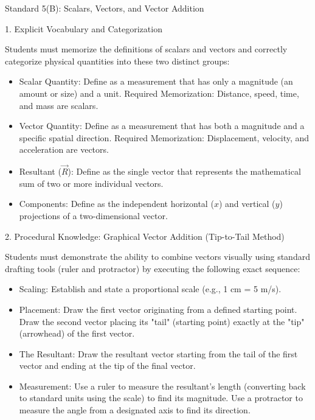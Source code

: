 \documentclass[]{article}
\begin{document}



Standard 5(B): Scalars, Vectors, and Vector Addition

1. Explicit Vocabulary and Categorization

Students must memorize the definitions of scalars and vectors and correctly categorize physical quantities into these two distinct groups:

\begin{itemize}[itemsep=0pt,topsep=0pt]
\item Scalar Quantity: Define as a measurement that has only a magnitude (an amount or size) and a unit. Required Memorization: Distance, speed, time, and mass are scalars.

\item Vector Quantity: Define as a measurement that has both a magnitude and a specific spatial direction.
Required Memorization: Displacement, velocity, and acceleration are vectors.

\item Resultant ($\vec{R}$): Define as the single vector that represents the mathematical sum of two or more individual vectors. 

\item Components: Define as the independent horizontal ($x$) and vertical ($y$) projections of a two-dimensional vector.
\end{itemize}

2. Procedural Knowledge: Graphical Vector Addition (Tip-to-Tail Method)

Students must demonstrate the ability to combine vectors visually using standard drafting tools (ruler and protractor) by executing the following exact sequence:

\begin{itemize}[itemsep=0pt,topsep=0pt]
    \item Scaling: Establish and state a proportional scale (e.g., 1 cm = 5 m/s).
    \item Placement: Draw the first vector originating from a defined starting point. Draw the second vector placing its "tail" (starting point) exactly at the "tip" (arrowhead) of the first vector.
    \item The Resultant: Draw the resultant vector starting from the tail of the first vector and ending at the tip of the final vector.
    \item Measurement: Use a ruler to measure the resultant's length (converting back to standard units using the scale) to find its magnitude. Use a protractor to measure the angle from a designated axis to find its direction.
\end{itemize}
\end{document}
